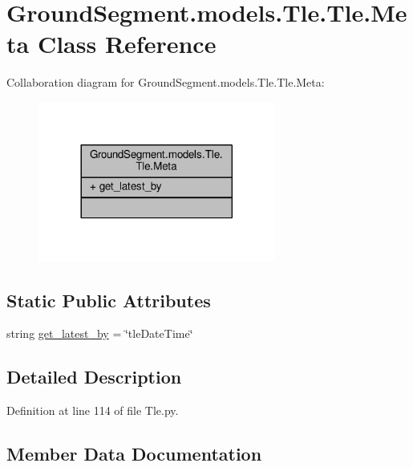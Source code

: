 \hypertarget{class_ground_segment_1_1models_1_1_tle_1_1_tle_1_1_meta}{}\section{Ground\+Segment.\+models.\+Tle.\+Tle.\+Meta Class Reference}
\label{class_ground_segment_1_1models_1_1_tle_1_1_tle_1_1_meta}


Collaboration diagram for Ground\+Segment.\+models.\+Tle.\+Tle.\+Meta\+:\nopagebreak
\begin{figure}[H]
\begin{center}
\leavevmode
\includegraphics[width=221pt]{class_ground_segment_1_1models_1_1_tle_1_1_tle_1_1_meta__coll__graph}
\end{center}
\end{figure}
\subsection*{Static Public Attributes}
\begin{DoxyCompactItemize}
\item 
string \hyperlink{class_ground_segment_1_1models_1_1_tle_1_1_tle_1_1_meta_a4b90de3b4688d9ff38172b5318c4be66}{get\+\_\+latest\+\_\+by} = \char`\"{}tle\+Date\+Time\char`\"{}
\end{DoxyCompactItemize}


\subsection{Detailed Description}


Definition at line 114 of file Tle.\+py.



\subsection{Member Data Documentation}
\hypertarget{class_ground_segment_1_1models_1_1_tle_1_1_tle_1_1_meta_a4b90de3b4688d9ff38172b5318c4be66}{}
